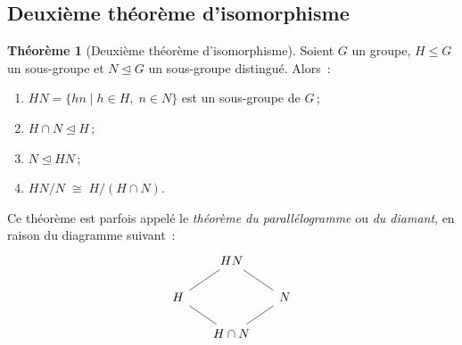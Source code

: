 \documentclass[12pt,a4paper,openany]{book}
\theoremstyle{definition}
\newtheorem{theoreme}{Théorème}[chapter]
\begin{document}
\subsection{Deuxième théorème d'isomorphisme}\label{subsec:deuxieme-iso}

\begin{theoreme}[Deuxième théorème d'isomorphisme]\label{thm:deuxieme-iso}
  Soient $G$ un groupe, $H\leq G$ un sous-groupe et $N\trianglelefteq G$
  un sous-groupe distingué.
  Alors~:
  \begin{enumerate}[label=(\roman*)]
    \item $HN = \{hn\mid h\in H,\; n\in N\}$ est un sous-groupe de $G$\,;
    \item $H\cap N \trianglelefteq H$\,;
    \item $N\trianglelefteq HN$\,;
    \item $HN/N \;\cong\; H/(H\cap N)$.
  \end{enumerate}
\end{theoreme}

Ce théorème est parfois appelé le \emph{théorème du
parallélogramme} ou \emph{du diamant}, en raison du diagramme suivant~:
\[
\begin{tikzcd}[row sep=1.5em, column sep=1.5em]
  & HN \arrow[dl,dash] \arrow[dr,dash] & \\
  H \arrow[dr,dash] & & N \arrow[dl,dash] \\
  & H\cap N &
\end{tikzcd}
\]
\end{document}
